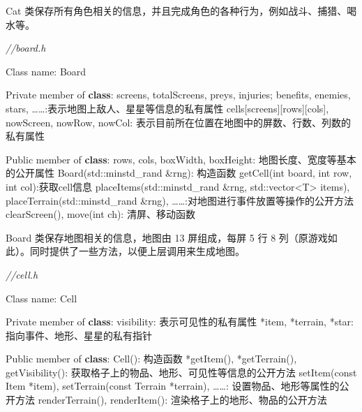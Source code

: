 \documentclass[hyperref,UTF8,a4paper]{ctexart}
\newenvironment{Shaded}{}{}
\newcommand{\AttributeTok}[1]{\textcolor[rgb]{0.49,0.56,0.16}{#1}}
\newcommand{\BuiltInTok}[1]{#1}
\newcommand{\CommentTok}[1]{\textcolor[rgb]{0.38,0.63,0.69}{\textit{#1}}}
\newcommand{\DataTypeTok}[1]{\textcolor[rgb]{0.56,0.13,0.00}{#1}}
\newcommand{\KeywordTok}[1]{\textcolor[rgb]{0.00,0.44,0.13}{\textbf{#1}}}
\newcommand{\NormalTok}[1]{#1}
\begin{document}
Cat
类保存所有角色相关的信息，并且完成角色的各种行为，例如战斗、捕猎、喝水等。

\begin{Shaded}
\begin{Highlighting}[]
\CommentTok{//board.h}

\NormalTok{Class name: Board}

\NormalTok{Private member of }\KeywordTok{class}\NormalTok{:}
\NormalTok{    screens, totalScreens, preys, injuries;}
\NormalTok{    benefits, enemies, stars, ……:表示地图上敌人、星星等信息的私有属性}
\NormalTok{    cells[screens][rows][cols], nowScreen, nowRow, nowCol: 表示目前所在位置在地图中的屏数、行数、列数的私有属性}

\NormalTok{Public member of }\KeywordTok{class}\NormalTok{:}
\NormalTok{    rows, cols, boxWidth, boxHeight: 地图长度、宽度等基本的公开属性}
\NormalTok{    Board(}\BuiltInTok{std::}\NormalTok{minstd_rand &rng): 构造函数}
\NormalTok{    getCell(}\DataTypeTok{int}\NormalTok{ board, }\DataTypeTok{int}\NormalTok{ row, }\DataTypeTok{int}\NormalTok{ col):获取cell信息}
\NormalTok{    placeItems(}\BuiltInTok{std::}\NormalTok{minstd_rand &rng, }\BuiltInTok{std::}\NormalTok{vector<T> items), placeTerrain(}\BuiltInTok{std::}\NormalTok{minstd_rand &rng), ……:对地图进行事件放置等操作的公开方法}
\NormalTok{    clearScreen(), move(}\DataTypeTok{int}\NormalTok{ ch): 清屏、移动函数}
\end{Highlighting}
\end{Shaded}

Board 类保存地图相关的信息，地图由 13 屏组成，每屏 5 行 8
列（原游戏如此）。同时提供了一些方法，以便上层调用来生成地图。

\begin{Shaded}
\begin{Highlighting}[]
\CommentTok{//cell.h}

\NormalTok{Class name: Cell}

\NormalTok{Private member of }\KeywordTok{class}\NormalTok{:}
\NormalTok{    visibility: 表示可见性的私有属性}
\NormalTok{    *item, *terrain, *star: 指向事件、地形、星星的私有指针}

\NormalTok{Public member of }\KeywordTok{class}\NormalTok{:}
\NormalTok{    Cell(): 构造函数}
\NormalTok{    *getItem(), *getTerrain(), getVisibility(): 获取格子上的物品、地形、可见性等信息的公开方法}
\NormalTok{    setItem(}\AttributeTok{const}\NormalTok{ Item *item), setTerrain(}\AttributeTok{const}\NormalTok{ Terrain *terrain), ……: 设置物品、地形等属性的公开方法}
\NormalTok{    renderTerrain(), renderItem(): 渲染格子上的地形、物品的公开方法}
\end{Highlighting}
\end{Shaded}
\end{document}
